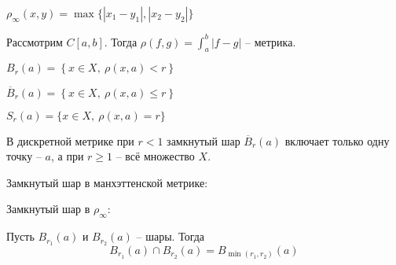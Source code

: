     \begin{Example}
        $\rho_\infty(x, y) = \max \{|x_1 - y_1|, |x_2 - y_2|\}$ 
    \end{Example}

    \begin{Example}
        Рассмотрим $C[a, b]$. Тогда $\rho (f, g) = \int_{a}^{b} |f - g|$ -- метрика.
    \end{Example}

    \begin{notation}
        $B_r(a) = \left\{x \in X, \ \rho (x, a) < r\right\}$
    \end{notation}

    \begin{notation}
        $\overline{B}_r(a) = \left\{x \in X, \ \rho(x, a) \leqslant r\right\}$
    \end{notation}

    \begin{notation}[Сфера]
        $S_r(a) = \{x \in X, \ \rho(x, a) = r\}$
    \end{notation}

    \begin{Example}
        В дискретной метрике при $r < 1$ замкнутый шар $\overline{B}_r(a)$ включает только одну точку -- $a$, 
        а при $r \geqslant 1$ -- всё множество $X$.
    \end{Example}

    \begin{Example}
        Замкнутый шар в манхэттенской метрике: 
        \begin{figure}[H]
            \centering
            \def\svgwidth{.3\columnwidth}
            
        \end{figure}
    \end{Example}

    \begin{Example}
        Замкнутый шар в $\rho_\infty$: 
        \begin{figure}[H]
            \centering
            \def\svgwidth{.3\columnwidth}
            
        \end{figure}
    \end{Example}

    \begin{Prop}
        Пусть $B_{r_1}(a)$ и $B_{r_2}(a)$ -- шары. Тогда 
        \[B_{r_1}(a) \cap B_{r_2}(a) = B_{\min (r_1, r_2)} (a)\]
    \end{Prop}

